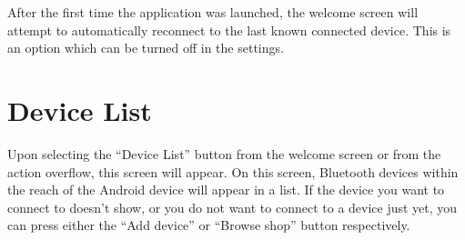 		After the first time the application was launched, the welcome screen will attempt to automatically reconnect to the last known connected device. This is an option which can be turned off in the settings. 
		\newpage
	\section{Device List}
		Upon selecting the ``Device List'' button from the welcome screen or from the action overflow, this screen will appear. On this screen, Bluetooth devices within the reach of the Android device will appear in a list. If the device you want to connect to doesn't show, or you do not want to connect to a device just yet, you can press either the ``Add device'' or ``Browse shop'' button respectively.\\
	\begin{figure}[H]
\hfill
\end{figure}
